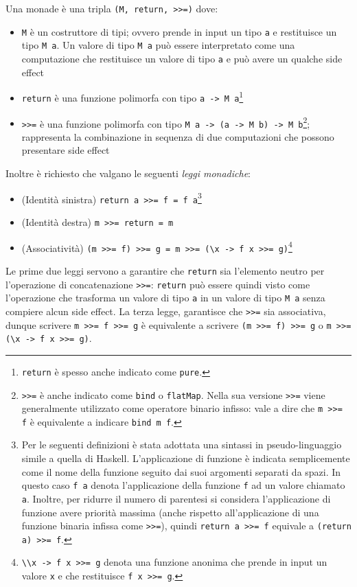 Una monade è una tripla \lstinline{(M, return, >>=)} dove:
\begin{itemize}
  \item \lstinline{M} è un costruttore di tipi; ovvero prende in input un tipo \lstinline{a} e restituisce un tipo \lstinline{M a}. Un valore di tipo \lstinline{M a} può essere interpretato come una computazione che restituisce un valore di tipo \lstinline{a} e può avere un qualche side effect
  \item \lstinline{return} è una funzione polimorfa con tipo \lstinline{a -> M a}\footnote{\lstinline{return} è spesso anche indicato come \lstinline{pure}.}
  \item \lstinline{>>=} è una funzione polimorfa con tipo \lstinline{M a -> (a -> M b) -> M b}\footnote{\lstinline{>>=} è anche indicato come \lstinline{bind} o \lstinline{flatMap}. Nella sua versione \lstinline{>>=} viene generalmente utilizzato come operatore binario infisso: vale a dire che \lstinline{m >>= f} è equivalente a indicare \lstinline{bind m f}.}; rappresenta la combinazione in sequenza di due computazioni che possono presentare side effect
\end{itemize}
Inoltre è richiesto che valgano le seguenti \emph{leggi monadiche}:
\begin{itemize}
  \item (Identità sinistra) \lstinline{return a >>= f = f a}\footnote{Per le seguenti definizioni è stata adottata una sintassi in pseudo-linguaggio simile a quella di Haskell. L'applicazione di funzione è indicata semplicemente come il nome della funzione seguito dai suoi argomenti separati da spazi. In questo caso \lstinline{f a} denota l'applicazione della funzione \lstinline{f} ad un valore chiamato \lstinline{a}. Inoltre, per ridurre il numero di parentesi si considera l'applicazione di funzione avere priorità massima (anche rispetto all'applicazione di una funzione binaria infissa come \lstinline{>>=}), quindi \lstinline{return a >>= f} equivale a \lstinline{(return a) >>= f}.}
  \item (Identità destra) \lstinline{m >>= return = m}
  \item (Associatività) \lstinline{(m >>= f) >>= g = m >>= (\x -> f x >>= g)}\footnote{\lstinline{\\x -> f x >>= g} denota una funzione anonima che prende in input un valore \lstinline{x} e che restituisce \lstinline{f x >>= g}.}
\end{itemize}
Le prime due leggi servono a garantire che \lstinline{return} sia l'elemento neutro per l'operazione di concatenazione \lstinline{>>=}: \lstinline{return} può essere quindi visto come l'operazione che trasforma un valore di tipo \lstinline{a} in un valore di tipo \lstinline{M a} senza compiere alcun side effect.
La terza legge, garantisce che \lstinline{>>=} sia associativa, dunque scrivere \lstinline{m >>= f >>= g} è equivalente a scrivere \lstinline{(m >>= f) >>= g} o \lstinline{m >>= (\x -> f x >>= g)}.


